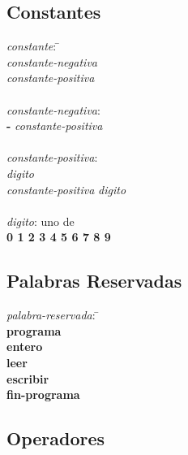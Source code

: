 \subsection{Constantes}

\begin{tabbing}

\textit{constante}: \= \+ \\
    \textit{constante-negativa} \\
    \textit{constante-positiva} \\

\- \\
\textit{constante-negativa}: \+ \\
    \textbf{-} \textit{constante-positiva} \\

\- \\
\textit{constante-positiva}: \+ \\
    \textit{digito} \\
    \textit{constante-positiva} \textit{digito}\\

\- \\
\textit{digito}: uno de \+ \\
    \textbf{0 1 2 3 4 5 6 7 8 9}

\end{tabbing}

\subsection{Palabras Reservadas}

\begin{tabbing}

\textit{palabra-reservada}: \= \+ \\
    \textbf{programa}\\
    \textbf{entero}\\
    \textbf{leer}\\
    \textbf{escribir}\\
    \textbf{fin-programa}

\end{tabbing}

\subsection{Operadores}

